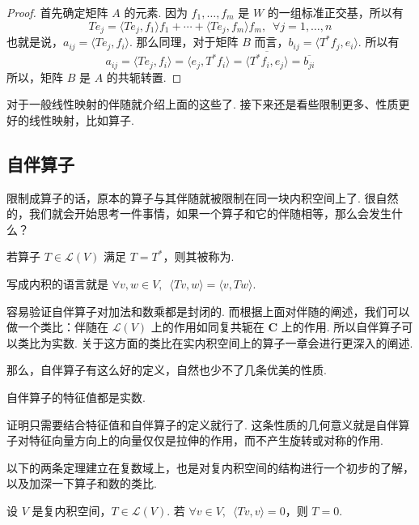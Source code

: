 \begin{proof}
    首先确定矩阵 $ A $ 的元素. 因为 $ f_1, \ldots , f_m $ 是 $ W $ 的一组标准正交基，所以有
    \[ Te_j = \langle Te_j, f_1 \rangle f_1 + \cdots + \langle Te_j, f_m \rangle f_m,\enspace \forall j = 1, \ldots , n \]
    也就是说，$ a_{ij} = \langle Te_j, f_i \rangle $. 那么同理，对于矩阵 $ B $ 而言，$ b_{ij} = \langle T^*f_j, e_i \rangle $. 所以有
    \[ a_{ij} = \langle Te_j, f_i \rangle = \langle e_j, T^*f_i \rangle = \overline{\langle T^*f_i, e_j \rangle} = \overline{b_{ji}} \]
    所以，矩阵 $ B $ 是 $ A $ 的共轭转置.
\end{proof}

对于一般线性映射的伴随就介绍上面的这些了. 接下来还是看些限制更多、性质更好的线性映射，比如算子.

\subsection{自伴算子}

限制成算子的话，原本的算子与其伴随就被限制在同一块内积空间上了. 很自然的，我们就会开始思考一件事情，如果一个算子和它的伴随相等，那么会发生什么？

\begin{definition}[自伴算子]
    若算子 $ T \in \mathcal{L}(V) $ 满足 $ T = T^* $，则其被称为.
\end{definition}

写成内积的语言就是 $ \forall v, w \in V,\enspace \langle Tv, w \rangle = \langle v, Tw \rangle $.

容易验证自伴算子对加法和数乘都是封闭的. 而根据上面对伴随的阐述，我们可以做一个类比：伴随在 $ \mathcal{L}(V) $ 上的作用如同复共轭在 $ \mathbf{C} $ 上的作用. 所以自伴算子可以类比为实数. 关于这方面的类比在实内积空间上的算子一章会进行更深入的阐述.

那么，自伴算子有这么好的定义，自然也少不了几条优美的性质.

\begin{theorem}
    自伴算子的特征值都是实数.
\end{theorem}

证明只需要结合特征值和自伴算子的定义就行了. 这条性质的几何意义就是自伴算子对特征向量方向上的向量仅仅是拉伸的作用，而不产生旋转或对称的作用.

以下的两条定理建立在复数域上，也是对复内积空间的结构进行一个初步的了解，以及加深一下算子和数的类比.

\begin{theorem} \label{thm:24:复内积空间}
    设 $ V $ 是复内积空间，$ T \in \mathcal{L}(V) $. 若 $ \forall v \in V,\enspace \langle Tv, v \rangle = 0 $，则 $ T = 0 $.
\end{theorem}


